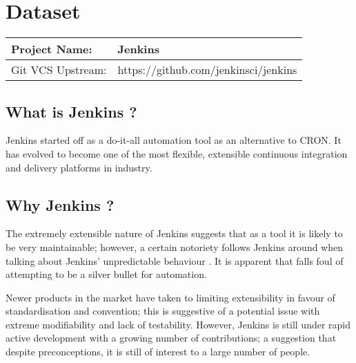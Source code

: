 \section{Dataset}


\begin{table}[H]
	\begin{tabular}{ | l |  l |}
		\hline
		Project Name: & Jenkins \parencite{jenkinsIOGitRepo} \\ 
		\hline
		Git VCS Upstream: & https://github.com/jenkinsci/jenkins \\
		\hline
	\end{tabular}
\end{table}


\subsection{What is Jenkins ?}

Jenkins started off as a do-it-all automation tool as an alternative to CRON. It has evolved to become one of the most flexible, extensible continuous integration and delivery platforms in industry.

\subsection{Why Jenkins ?}

The extremely extensible nature of Jenkins suggests that as a tool it is likely to be very maintainable; however, a certain notoriety follows Jenkins around when talking about Jenkins' unpredictable behaviour \parencite{jenkinsBugTracker}. It is apparent that falls foul of attempting to be a silver bullet for automation. 

Newer products in the market have taken to limiting extensibility in favour of standardisation and convention; this is suggestive of a potential issue with extreme modifiability and lack of testability. However, Jenkins is still under rapid active development with a growing number of contributions; a suggestion that despite preconceptions, it is still of interest to a large number of people.